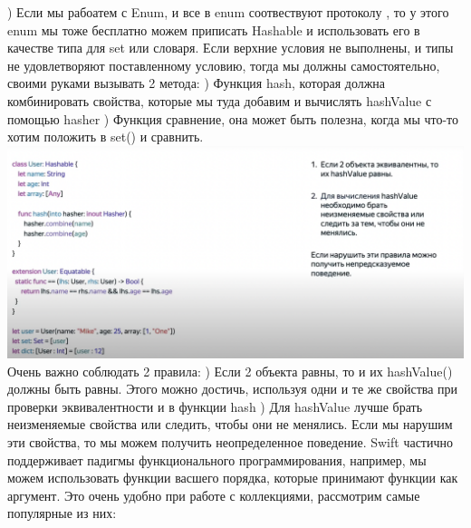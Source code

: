 \documentclass{article}
\begin{document}
    ) Если мы рабоатем с Enum, и все  в enum соотвествуют протоколу , то у этого enum мы тоже бесплатно можем приписать Hashable и использовать его в качестве типа для set или словаря. 
    \newline
    Если верхние условия не выполнены, и типы не удовлетворяют поставленному условию, тогда мы должны самостоятельно, своими руками вызывать 2 метода: 
    ) Функция hash, которая должна комбинировать свойства, которые мы туда добавим и вычислять hashValue с помощью hasher
    ) Функция сравнение, она может быть полезна, когда мы что-то хотим положить в set() и сравнить. 
    \newline
    \includegraphics[scale = 0.2]{pic/Снимок экрана 2023-07-29 в 00.24.10.png}
    \newline
    Очень важно соблюдать 2 правила: 
    ) Если 2 объекта равны, то и их hashValue() должны быть равны. Этого можно достичь, используя одни и те же свойства при проверки эквивалентности и в функции hash
    ) Для hashValue лучше брать неизменяемые свойства или следить, чтобы они не менялись. 
    \newline
    Если мы нарушим эти свойства, то мы можем получить неопределенное поведение. 
    \newline
    Swift частично поддерживает падигмы функционального программирования, например, мы можем использовать функции васшего порядка, которые принимают функции как аргумент. Это очень удобно при работе с коллекциями, рассмотрим самые популярные из них: 
    \newline
\end{document}
